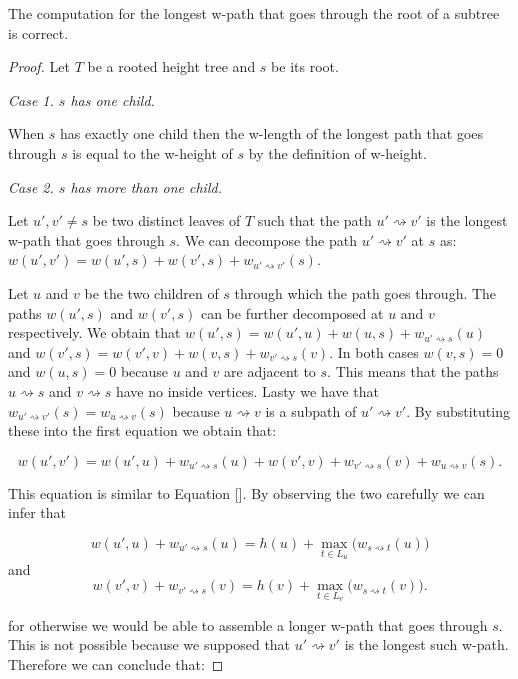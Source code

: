 \begin{lem} The computation for the longest w-path that goes through the root of a subtree is correct. \end{lem}
\begin{proof}

   Let $T$ be a rooted height tree and $s$ be its root.

   \em Case 1. $s$ has one child. \em

   When $s$ has exactly one child then the w-length of the longest path that goes through $s$ is equal to the w-height of $s$ by the definition of w-height.

   \em Case 2. $s$ has more than one child. \em

   Let $u', v' \ne s$ be two distinct leaves of $T$ such that the path $u' \rightsquigarrow v'$ is the longest w-path that goes through $s$.
   We can decompose the path $u' \rightsquigarrow v'$ at $s$ as: $w(u', v') = w(u', s) + w(v', s) + w_{u' \rightsquigarrow v'}(s)$.

   Let $u$ and $v$ be the two children of $s$ through which the path goes through.
   The paths $w(u', s)$ and $w(v', s)$ can be further decomposed at $u$ and $v$ respectively. We obtain that
   $w(u', s) = w(u', u) + w(u, s) + w_{u' \rightsquigarrow s}(u)$ and
   $w(v', s) = w(v', v) + w(v, s) + w_{v' \rightsquigarrow s}(v)$.
   In both cases $w(v, s) = 0$ and $w(u, s) = 0$ because $u$ and $v$ are adjacent to $s$. This means that the paths $u \rightsquigarrow s$ and $v \rightsquigarrow s$ have no inside vertices.
   Lasty we have that $w_{u' \rightsquigarrow v'}(s) = w_{u \rightsquigarrow v}(s)$ because $u \rightsquigarrow v$ is a subpath of $u' \rightsquigarrow v'$.
   By substituting these into the first equation we obtain that:

   $$w(u', v') = w(u', u) + w_{u' \rightsquigarrow s}(u) + w(v', v) + w_{v' \rightsquigarrow s}(v) + w_{u \rightsquigarrow v}(s). $$

   This equation is similar to Equation []. By observing the two carefully we can infer that

   $$w(u', u) + w_{u' \rightsquigarrow s}(u) = h(u) + \max\limits_{t \in L_u}\Big(w_{s \rightsquigarrow t}(u)\Big)$$
   and
   $$w(v', v) + w_{v' \rightsquigarrow s}(v) = h(v) + \max\limits_{t \in L_v}\Big(w_{s \rightsquigarrow t}(v)\Big).$$

   for otherwise we would be able to assemble a longer w-path that goes through $s$. This is not possible because we supposed that $u' \rightsquigarrow v'$ is the longest such w-path. Therefore we can conclude that:


\end{proof}

